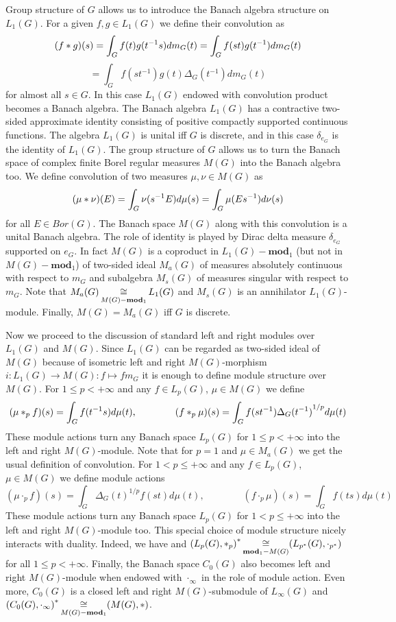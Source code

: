 Group structure of $G$ allows us to introduce the Banach algebra structure on
$L_1(G)$. For a given $f,g\in L_1(G)$ we define their convolution as
$$
(f\ast g)(s)=\int_G f(t)g(t^{-1}s)dm_G(t)=\int_G f(st)g(t^{-1})dm_G(t)
$$
$$=\int_G f(st^{-1})g(t)\Delta_G(t^{-1})dm_G(t)
$$
for almost all $s\in G$. In this case $L_1(G)$ endowed with convolution 
product becomes a Banach algebra. The Banach algebra $L_1(G)$ has a 
contractive two-sided approximate identity consisting of positive compactly 
supported continuous functions. The algebra $L_1(G)$ is unital iff $G$ is 
discrete, and in this case $\delta_{e_G}$ is the identity of $L_1(G)$. The 
group structure of $G$ allows us to turn the Banach space of complex finite 
Borel regular measures $M(G)$ into the Banach algebra too. We define 
convolution of two measures $\mu,\nu\in M(G)$ as
$$
(\mu\ast \nu)(E)=\int_G\nu(s^{-1}E)d\mu(s)=\int_G\mu(Es^{-1})d\nu(s)
$$
for all $E\in Bor(G)$. The Banach space $M(G)$ along with this convolution is 
a unital Banach algebra. The role of identity is played by Dirac delta 
measure $\delta_{e_G}$ supported on $e_G$. In fact $M(G)$ is a coproduct 
in $L_1(G)-\mathbf{mod}_1$ (but not in $M(G)-\mathbf{mod}_1$) of two-sided 
ideal $M_a(G)$ of measures absolutely continuous with respect to $m_G$ and 
subalgebra $M_s(G)$ of measures singular with respect to $m_G$. Note 
that $M_a(G)\mathop{\mathbin{\cong}}\limits_{M(G)-\mathbf{mod}_1}L_1(G)$ and $M_s(G)$ is an 
annihilator $L_1(G)$-module. Finally, $M(G)=M_a(G)$ iff $G$ is discrete. 

Now we proceed to the discussion of standard left and right modules 
over $L_1(G)$ and $M(G)$. Since $L_1(G)$ can be regarded as two-sided ideal 
of $M(G)$ because of isometric left and 
right $M(G)$-morphism $i:L_1(G)\to M(G):f\mapsto f m_G$ it is enough to define 
module structure over $M(G)$. For $1\leq p<+\infty$ and 
any $f\in L_p(G)$, $\mu\in M(G)$ we define
$$
(\mu\ast_p f)(s)=\int_G f(t^{-1}s)d\mu(t), \qquad\qquad (f\ast_p
\mu)(s)=\int_G f(st^{-1}){\Delta_G(t^{-1})}^{1/p}d\mu(t)
$$
These module actions turn any Banach space $L_p(G)$ for $1\leq p<+\infty$ into 
the left and right $M(G)$-module. Note that for $p=1$ and $\mu\in M_a(G)$ we 
get the usual definition of convolution. For $1<p\leq +\infty$ and 
any $f\in L_p(G)$, $\mu\in M(G)$ we define module actions
$$
(\mu\cdot_p f)(s)=\int_G {\Delta_G(t)}^{1/p}f(st)d\mu(t), \qquad\qquad (f\cdot_p
\mu)(s)=\int_G f(ts)d\mu(t)
$$
These module actions turn any Banach space $L_p(G)$ for $1<p\leq+\infty$ into 
the left and right $M(G)$-module too. This special choice of module structure 
nicely interacts with duality. Indeed, we have 
and ${(L_p(G),\ast_p)}^*\mathop{\mathbin{\cong}}\limits_{\mathbf{mod}_1-M(G)}(L_{p^*}(G),\cdot_{p^*})$ 
for all $1\leq p<+\infty$. Finally, the Banach space $C_0(G)$ also becomes left 
and right $M(G)$-module when endowed with $\cdot_\infty$ in the role of module 
action. Even more, $C_0(G)$ is a closed left and right $M(G)$-submodule 
of $L_\infty(G)$ 
and ${(C_0(G),\cdot_\infty)}^*\mathop{\mathbin{\cong}}\limits_{M(G)-\mathbf{mod}_1}(M(G),\ast)$.

